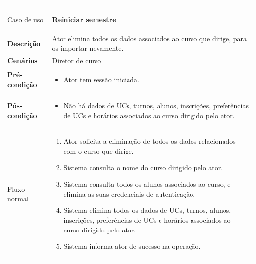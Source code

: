 \documentclass[12pt, a4paper]{article}
\newenvironment{condition}{
    \begin{itemize}[wide=0pt]
        \vspace{-0.2cm}
}{
        \vspace{-0.5cm}
    \end{itemize}
}
\newcommand\flow[1]{
    Fluxo normal &
    \vspace{-0.9cm}
    \singlespacing
    \begin{enumerate}[wide=0pt]
        #1
        \vspace{-0.3cm}
    \end{enumerate} \\ \hline
}
\newenvironment{usecase}[5]{
    \begin{longtable}{|>{\centering\arraybackslash\bf}m{3cm}|m{13cm}|}
        \multicolumn{2}{c}{\ldots Continua \ldots} \\
        \endfoot
        \endlastfoot

        \hline
        Caso de uso & \textbf{#1} \\

        \hline
        Descrição & #2 \\

        \hline
        Cenários & #3 \\

        \hline
        Pré-condição &
        \vspace{-0.8cm}
        \begin{condition}
            #4
        \end{condition} \\

        \hline
        Pós-condição &
        \vspace{-0.8cm}
        \begin{condition}
            #5
        \end{condition} \\

        \hline
}{
\end{longtable}
}
\begin{document}
\begin{usecase}
    {Reiniciar semestre}
    {Ator elimina todos os dados associados ao curso que dirige, para os importar novamente.}
    {Diretor de curso}
    {\item Ator tem sessão iniciada.}
    {
        \item Não há dados de UCs, turnos, alunos, inscrições, preferências de UCs e horários
            associados ao curso dirigido pelo ator.
    }

    \flow{
        \item Ator solicita a eliminação de todos os dados relacionados com o curso que dirige.
        \item Sistema consulta o nome do curso dirigido pelo ator.
        \item Sistema consulta todos os alunos associados ao curso, e elimina as suas credenciais de
            autenticação.
        \item Sistema elimina todos os dados de UCs, turnos, alunos, inscrições, preferências de UCs
            e horários associados ao curso dirigido pelo ator.
        \item Sistema informa ator de sucesso na operação.
    }
\end{usecase}

\pagebreak
\end{document}
